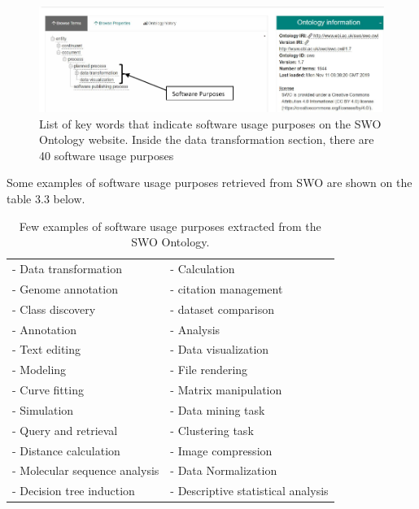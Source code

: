 \begin{figure}[htbp]
	\centering
	\includegraphics[width=.99\textwidth]{4.graphics/figures/ch_3/SWO2}
	\caption{List of key words that indicate software usage purposes on the SWO Ontology website. Inside the data transformation section, there are 40 software usage purposes}
	\label{fig:chapter03:setup}
\end{figure}

Some examples of software usage purposes retrieved from SWO are shown on the table 3.3 below.

\begin{table}[h!]
	\begin{center}
		\caption{Few examples of software usage purposes extracted from the SWO Ontology.}
		\label{tab:table1}
		\begin{tabular}{|l|l|} %
			
			\hline
			- Data transformation & - Calculation  \\
			- Genome annotation   & - citation management  \\
			- Class discovery     & - dataset comparison   \\
			- Annotation          & - Analysis \\
			- Text editing        & - Data visualization  \\
			- Modeling           & - File rendering   \\
			- Curve fitting       & - Matrix manipulation  \\
			- Simulation          & - Data mining task   \\
			- Query and retrieval & - Clustering task \\
			- Distance calculation & - Image compression \\
			- Molecular sequence analysis & - Data Normalization \\
			- Decision tree induction & - Descriptive statistical analysis \\
			
			\hline
		\end{tabular}
	\end{center}
\end{table}


